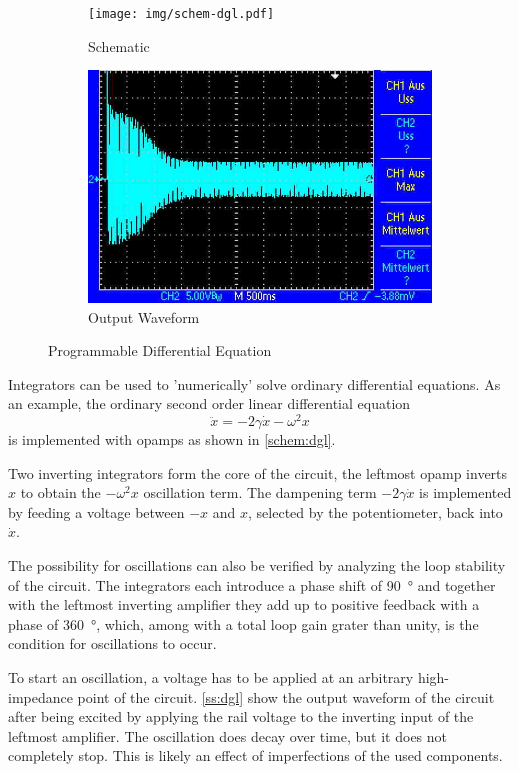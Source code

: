 \begin{figure}
	\centering
	\begin{subfigure}{0.49\textwidth}
		\centering
		\texttt{[image: img/schem-dgl.pdf]}
		\caption{Schematic}
		\label{schem:dgl}
	\end{subfigure}
	\begin{subfigure}{0.4\textwidth}
		\centering
		\includegraphics[width=.9\linewidth]{./img/ss-dgl.jpg}
		\caption{Output Waveform}
		\label{ss:dgl}
	\end{subfigure}
	\caption{Programmable Differential Equation}
\end{figure}

Integrators can be used to 'numerically' solve ordinary differential equations.
As an example, the ordinary second order linear differential equation \[\ddot{x} = - 2 \gamma \dot{x} - \omega^2 x\] is implemented with opamps as shown in \autoref{schem:dgl}.

Two inverting integrators form the core of the circuit, the leftmost opamp inverts $x$ to obtain the $-\omega^2 x$ oscillation term.
The dampening term $-2\gamma\dot{x}$ is implemented by feeding a voltage between $-x$ and $x$, selected by the potentiometer, back into $\dot{x}$.

The possibility for oscillations can also be verified by analyzing the loop stability of the circuit.
The integrators each introduce a phase shift of \SI{90}{\degree} and together with the leftmost inverting amplifier they add up to positive feedback with a phase of \SI{360}{\degree}, which, among with a total loop gain grater than unity, is the condition for oscillations to occur.

To start an oscillation, a voltage has to be applied at an arbitrary high-impedance point of the circuit.
\autoref{ss:dgl} show the output waveform of the circuit after being excited by applying the rail voltage to the inverting input of the leftmost amplifier.
The oscillation does decay over time, but it does not completely stop.
This is likely an effect of imperfections of the used components.
